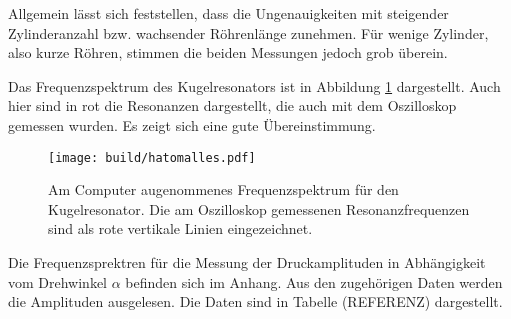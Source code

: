 Allgemein lässt sich feststellen, dass die Ungenauigkeiten mit steigender Zylinderanzahl
bzw. wachsender Röhrenlänge zunehmen. Für wenige Zylinder, also kurze Röhren, stimmen
die beiden Messungen jedoch grob überein.

Das Frequenzspektrum des Kugelresonators ist in Abbildung \ref{fig:hatomalles} dargestellt.
Auch hier sind in rot die Resonanzen dargestellt, die auch mit dem Oszilloskop
gemessen wurden. Es zeigt sich eine gute Übereinstimmung.

\begin{figure}
  \centering
  \texttt{[image: build/hatomalles.pdf]}
  \caption{Am Computer augenommenes Frequenzspektrum für den Kugelresonator.
  Die am Oszilloskop gemessenen Resonanzfrequenzen sind als rote vertikale
  Linien eingezeichnet.}
  \label{fig:hatomalles}
\end{figure}


Die Frequenzsprektren für die Messung der Druckamplituden in Abhängigkeit vom
Drehwinkel $\alpha$ befinden sich im Anhang. Aus den zugehörigen Daten werden
die Amplituden ausgelesen. Die Daten sind in Tabelle (REFERENZ) dargestellt.

